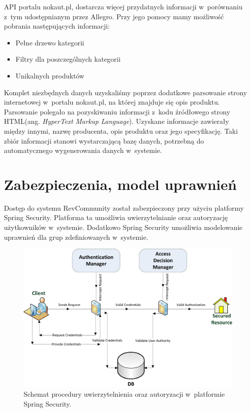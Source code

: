 API portalu nokaut.pl, dostarcza więcej przydatnych informacji w~porównaniu z~tym udostępnianym przez Allegro. Przy jego pomocy mamy możliwość pobrania następujących informacji:

\begin{itemize}
\item Pełne drzewo kategorii
\item Filtry dla poszczególnych kategorii
\item Unikalnych produktów
\end{itemize}

Komplet niezbędnych danych uzyskaliśmy poprzez dodatkowe parsowanie strony internetowej w~portalu nokaut.pl, na której znajduje się opis produktu. Parsowanie polegało na pozyskiwaniu informacji z~kodu źródłowego strony HTML(ang. \textit{HyperText Markup Language}). Uzyskane informacje zawierały między innymi, nazwę producenta, opis produktu oraz jego specyfikację. Taki zbiór informacji stanowi wystarczającą bazę danych, potrzebną do automatycznego wygenerowania danych w~systemie.

\section{Zabezpieczenia, model uprawnień}

Dostęp do systemu RevCommunity został zabezpieczony przy użyciu platformy Spring Security. Platforma ta umożliwia uwierzytelnianie oraz autoryzację użytkowników w~systemie. Dodatkowo Spring Security umożliwia modelowanie uprawnień dla grup zdefiniowanych w~systemie.

\begin{figure}[H]
	\centering
	\includegraphics[width=1.00\textwidth]{images/spring_diagram.jpg}
	\caption{Schemat procedury uwierzytelnienia oraz autoryzacji w~platformie Spring Security.}
\end{figure}

